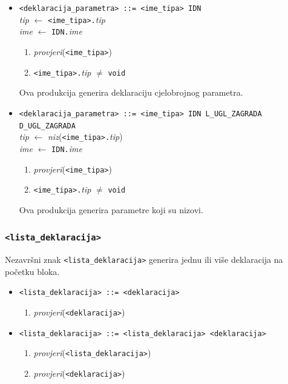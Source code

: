 \documentclass[times, 12pt, utf8]{book}
\begin{document}
\begin{itemize}

\item
\verb|<deklaracija_parametra> ::= <ime_tipa> IDN|\\
\emph{tip} \(\leftarrow\) \verb|<ime_tipa>.|\emph{tip}\\
\emph{ime} \(\leftarrow\) \verb|IDN.|\emph{ime}
\begin{enumerate}
\item
\emph{provjeri}(\verb|<ime_tipa>|)
\item
\verb|<ime_tipa>.|\emph{tip} \(\neq\) \verb|void|
\end{enumerate}

Ova produkcija generira deklaraciju cjelobrojnog parametra.

\item
\verb|<deklaracija_parametra> ::= <ime_tipa> IDN L_UGL_ZAGRADA D_UGL_ZAGRADA|\\
\emph{tip} \(\leftarrow\) \emph{niz}(\verb|<ime_tipa>.|\emph{tip})\\
\emph{ime} \(\leftarrow\) \verb|IDN.|\emph{ime}
\begin{enumerate}
\item
\emph{provjeri}(\verb|<ime_tipa>|)
\item
\verb|<ime_tipa>.|\emph{tip} \(\neq\) \verb|void|
\end{enumerate}

Ova produkcija generira parametre koji su nizovi.

\end{itemize}


\subsubsection{\texttt{<lista\_deklaracija>}}

Nezavršni znak \verb|<lista_deklaracija>| generira jednu ili više deklaracija na početku bloka.

\begin{itemize}

\item
\verb|<lista_deklaracija> ::= <deklaracija>|
\begin{enumerate}
\item
\emph{provjeri}(\verb|<deklaracija>|)
\end{enumerate}

\item
\verb|<lista_deklaracija> ::= <lista_deklaracija> <deklaracija>|
\begin{enumerate}
\item
\emph{provjeri}(\verb|<lista_deklaracija>|)
\item
\emph{provjeri}(\verb|<deklaracija>|)
\end{enumerate}

\end{itemize}
\end{document}
